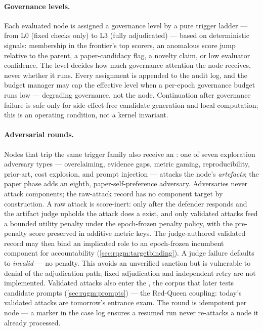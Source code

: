 \paragraph{Governance levels.}
Each evaluated node is assigned a governance level by a pure trigger
ladder --- from L0 (fixed checks only) to L3 (fully adjudicated) ---
based on deterministic signals: membership in the frontier's top
scorers, an anomalous score jump relative to the parent, a
paper-candidacy flag, a novelty claim, or low evaluator confidence.
The level decides how much governance attention the node receives,
never whether it runs. Every assignment is appended to the audit log,
and the budget manager may cap the effective level when a per-epoch
governance budget runs low --- degrading governance, not the node.
Continuation after governance failure is safe only for side-effect-free
candidate generation and local computation; this is an operating
condition, not a kernel invariant.

\paragraph{Adversarial rounds.}
Nodes that trip the same trigger family also receive an
: one of seven exploration adversary types ---
overclaiming, evidence gaps, metric gaming, reproducibility,
prior-art, cost explosion, and prompt injection --- attacks the
node's \emph{artefacts}; the paper phase adds an eighth,
paper-self-preference adversary. Adversaries never attack components;
the raw-attack record has no component target by construction. A raw attack is
score-inert: only after the defender responds and the artifact judge
upholds the attack does a  exist, and
only validated attacks feed a bounded utility penalty under the
epoch-frozen penalty policy, with the pre-penalty score preserved in
additive metric keys. The judge-authored validated record may then bind
an implicated role to an epoch-frozen incumbent component for
accountability (\cref{sec:rqgm:targetbinding}). A judge failure defaults
to \emph{invalid} --- no penalty. This avoids an unverified sanction but
is vulnerable to denial of the adjudication path; fixed adjudication and
independent retry are not implemented. Validated attacks also enter the
, the corpus that later tests candidate prompts
(\cref{sec:rqgm:prompts}) --- the Red-Queen coupling: today's
validated attacks are tomorrow's entrance exam. The round is
idempotent per node --- a marker in the case log ensures a resumed
run never re-attacks a node it already processed.

